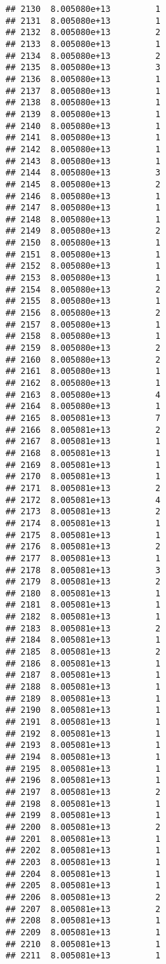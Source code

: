 \documentclass[
]{article}
\begin{document}
\begin{verbatim}
## 2130  8.005080e+13         1
## 2131  8.005080e+13         1
## 2132  8.005080e+13         2
## 2133  8.005080e+13         1
## 2134  8.005080e+13         2
## 2135  8.005080e+13         3
## 2136  8.005080e+13         1
## 2137  8.005080e+13         1
## 2138  8.005080e+13         1
## 2139  8.005080e+13         1
## 2140  8.005080e+13         1
## 2141  8.005080e+13         1
## 2142  8.005080e+13         1
## 2143  8.005080e+13         1
## 2144  8.005080e+13         3
## 2145  8.005080e+13         2
## 2146  8.005080e+13         1
## 2147  8.005080e+13         1
## 2148  8.005080e+13         1
## 2149  8.005080e+13         2
## 2150  8.005080e+13         1
## 2151  8.005080e+13         1
## 2152  8.005080e+13         1
## 2153  8.005080e+13         1
## 2154  8.005080e+13         2
## 2155  8.005080e+13         1
## 2156  8.005080e+13         2
## 2157  8.005080e+13         1
## 2158  8.005080e+13         1
## 2159  8.005080e+13         2
## 2160  8.005080e+13         2
## 2161  8.005080e+13         1
## 2162  8.005080e+13         1
## 2163  8.005080e+13         4
## 2164  8.005080e+13         1
## 2165  8.005081e+13         7
## 2166  8.005081e+13         2
## 2167  8.005081e+13         1
## 2168  8.005081e+13         1
## 2169  8.005081e+13         1
## 2170  8.005081e+13         1
## 2171  8.005081e+13         2
## 2172  8.005081e+13         4
## 2173  8.005081e+13         2
## 2174  8.005081e+13         1
## 2175  8.005081e+13         1
## 2176  8.005081e+13         2
## 2177  8.005081e+13         1
## 2178  8.005081e+13         3
## 2179  8.005081e+13         2
## 2180  8.005081e+13         1
## 2181  8.005081e+13         1
## 2182  8.005081e+13         1
## 2183  8.005081e+13         2
## 2184  8.005081e+13         1
## 2185  8.005081e+13         2
## 2186  8.005081e+13         1
## 2187  8.005081e+13         1
## 2188  8.005081e+13         1
## 2189  8.005081e+13         1
## 2190  8.005081e+13         1
## 2191  8.005081e+13         1
## 2192  8.005081e+13         1
## 2193  8.005081e+13         1
## 2194  8.005081e+13         1
## 2195  8.005081e+13         1
## 2196  8.005081e+13         1
## 2197  8.005081e+13         2
## 2198  8.005081e+13         1
## 2199  8.005081e+13         1
## 2200  8.005081e+13         2
## 2201  8.005081e+13         1
## 2202  8.005081e+13         1
## 2203  8.005081e+13         1
## 2204  8.005081e+13         1
## 2205  8.005081e+13         1
## 2206  8.005081e+13         2
## 2207  8.005081e+13         2
## 2208  8.005081e+13         1
## 2209  8.005081e+13         1
## 2210  8.005081e+13         1
## 2211  8.005081e+13         1

\end{verbatim}
\end{document}
